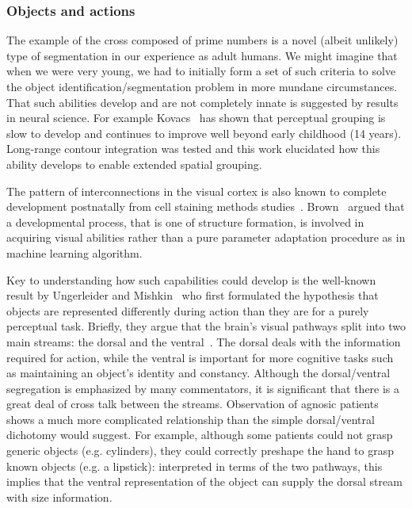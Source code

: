 \subsubsection*{Objects and actions}

The example of the cross composed of prime numbers is a novel (albeit
unlikely) type of segmentation in our experience as adult humans.  We
might imagine that when we were very young, we had to initially form a
set of such criteria to solve the object identification/segmentation
problem in more mundane circumstances. That such abilities develop
and are not completely innate is suggested by results in neural
science. For example Kovacs~\cite{kovacs00human} has shown that
perceptual grouping is slow to develop and continues
to improve well beyond early
childhood (14 years). Long-range contour integration was tested and
this work elucidated how this ability develops to enable extended
spatial grouping.  

\ifverbose
The pattern of interconnections in the visual cortex is also known
to complete development postnatally from cell staining methods
studies~\cite{burkhalter93development,callaway92development}.
Brown~\cite{brown94vision} argued that a developmental process, that
is one of structure formation, is involved in acquiring visual
abilities rather than a pure parameter adaptation procedure as in
machine learning algorithm.
\fi 

Key to understanding how such capabilities could develop is the
well-known result by Ungerleider and Mishkin~\cite{ungerleider82two}
who first formulated the hypothesis that objects are represented
differently during action than they are for a purely perceptual task.
Briefly, they argue that the brain's visual pathways split into two
main streams: the dorsal and the ventral~\cite{milner95visual}. The
dorsal deals with the information required for action, while the
ventral is important for more cognitive tasks such as maintaining an
object's identity and constancy.  Although the dorsal/ventral
segregation is emphasized by many commentators, it is significant that
there is a great deal of cross talk between the streams.  Observation
of agnosic patients~\cite{jeannerod97cognitive} shows a much more
complicated relationship than the simple dorsal/ventral dichotomy
would suggest.  For example, although some patients could not grasp
generic objects (e.g.  cylinders), they could correctly preshape the
hand to grasp known objects (e.g. a lipstick): interpreted in terms of
the two pathways, this implies that the ventral representation of the
object can supply the dorsal stream with size information.

